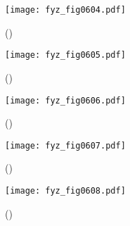     \begin{figure}[ht!] %
      \centering
      \texttt{[image: fyz\_fig0604.pdf]}
      \caption{
               (\cite[s.~707]{Feynman02})}
      \label{fyz:fig0604}
    \end{figure}

    \begin{figure}[ht!] %
      \centering
      \texttt{[image: fyz\_fig0605.pdf]}
      \caption{
               (\cite[s.~707]{Feynman02})}
      \label{fyz:fig0605}
    \end{figure}

    \begin{figure}[ht!] %
      \centering
      \texttt{[image: fyz\_fig0606.pdf]}
      \caption{
               (\cite[s.~707]{Feynman02})}
      \label{fyz:fig0606}
    \end{figure}

    \begin{figure}[ht!] %
      \centering
      \texttt{[image: fyz\_fig0607.pdf]}
      \caption{
               (\cite[s.~707]{Feynman02})}
      \label{fyz:fig0607}
    \end{figure}

    \begin{figure}[ht!] %
      \centering
      \texttt{[image: fyz\_fig0608.pdf]}
      \caption{
               (\cite[s.~707]{Feynman02})}
      \label{fyz:fig0608}
    \end{figure}

